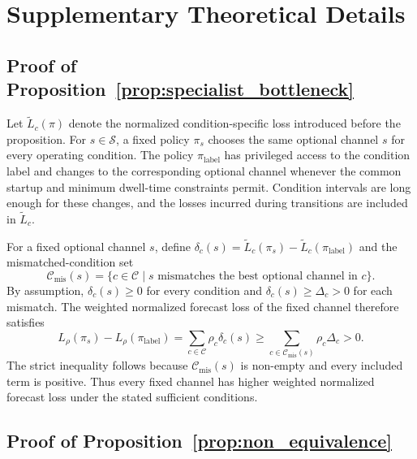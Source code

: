 \section{Supplementary Theoretical Details}

\subsection{Proof of Proposition~\ref{prop:specialist_bottleneck}}
\label{apx:specialist_bottleneck_proof}

Let $\widetilde L_c(\pi)$ denote the normalized condition-specific loss introduced
before the proposition. For $s\in\mathcal{S}$, a fixed policy $\pi_s$ chooses the
same optional channel $s$ for every operating condition. The policy
$\pi_{\text{label}}$ has privileged access to the condition label and changes to the
corresponding optional channel whenever the common startup and minimum
dwell-time constraints permit. Condition intervals are long
enough for these changes, and the losses incurred during transitions are
included in $\widetilde L_c$.

For a fixed optional channel $s$, define
$\delta_c(s)=\widetilde L_c(\pi_s)-
\widetilde L_c(\pi_{\text{label}})$ and the mismatched-condition set
\begin{equation}
  \mathcal{C}_{\mathrm{mis}}(s)
  =
  \{c\in\mathcal{C}\mid s\text{ mismatches the best optional channel in }c\}.
\end{equation}
By assumption, $\delta_c(s)\geq0$ for every condition and
$\delta_c(s)\geq\Delta_c>0$ for each mismatch. The weighted normalized forecast
loss of the fixed channel therefore satisfies
\begin{equation}
  L_{\rho}(\pi_s)
  -
  L_{\rho}(\pi_{\text{label}})
  =
  \sum_{c\in\mathcal{C}}\rho_c\delta_c(s)
  \geq
  \sum_{c\in\mathcal{C}_{\mathrm{mis}}(s)}
  \rho_c \Delta_c
  >
  0 .
\end{equation}
The strict inequality follows because
$\mathcal{C}_{\mathrm{mis}}(s)$ is non-empty and every included term is
positive. Thus every fixed channel has higher weighted normalized forecast loss under the stated
sufficient conditions.

\subsection{Proof of Proposition~\ref{prop:non_equivalence}}
\label{apx:non_equivalence_proof}

